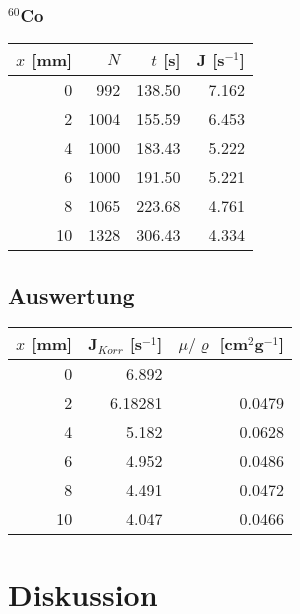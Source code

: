 \documentclass[12pt,a4paper]{article}
\begin{document}
\subsubsection*{${}^{60}$Co}
\begin{tabular}{|r|r|r|r|}
\hline
$x$ [mm]&$N$&$t$ [s]&J [s${}^{-1}$]\\
\hline
0&992&138.50&7.162\\
2&1004&155.59&6.453\\
4&1000&183.43&5.222\\
6&1000&191.50&5.221\\
8&1065&223.68&4.761\\
10&1328&306.43&4.334\\
\hline
\end{tabular}


\subsection*{Auswertung}
\begin{tabular}{|r|r|r|}
\hline
$x$ [mm]&J$_{Korr}$ [s$^{-1}$]&$\mu /\varrho $ [cm${}^2$g${}^{-1}$]\\
\hline
0&6.892&\\
2&6.18281&0.0479\\
4&5.182&0.0628\\
6&4.952&0.0486\\
8&4.491&0.0472\\
10&4.047&0.0466\\
\hline
\end{tabular}

\section*{Diskussion}
\end{document}
